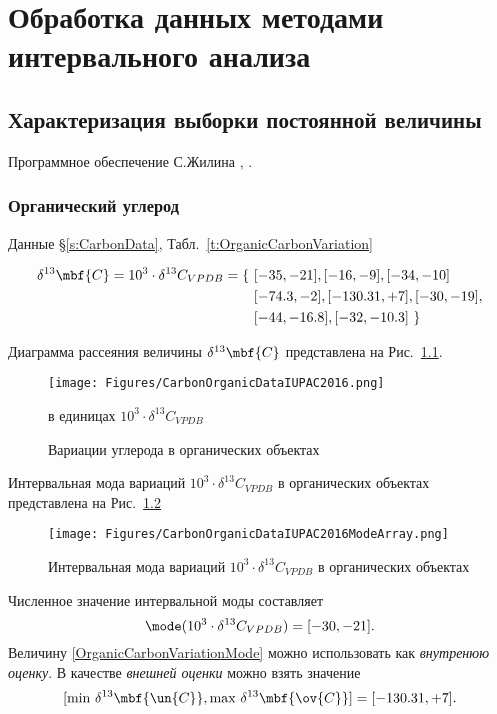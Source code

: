 \documentclass[a5paper,openany]{book}
\begin{document}
\chapter{Обработка данных методами интервального анализа}\label{s:DataAnalysis}

\section{Характеризация выборки постоянной величины}

Программное обеспечение С.Жилина \cite{InteSoft}, \cite{InteKaucherSoft}.

\subsection{Органический углерод}

Данные \S\ref{s:CarbonData}, Табл.~\ref{t:OrganicCarbonVariation}

\begin{align}
\delta ^{13}\mbf{C} =	10^3 \cdot \delta ^{13}C_{VPDB} = \{ \
&	[-35, -21 ], [ -16, -9 ], [ -34, -10 ] \nonumber \\
&	[ -74.3, -2 ], [ -130.31, +7 ], [ -30, -19], \nonumber \\
& 	[ -44, -16.8], [ -32, -10.3] \	\}
\end{align}

Диаграмма рассеяния величины $\delta ^{13}\mbf{C}$ представлена на Рис.~\ref{f:OrganicCarbonVariation}.
\begin{figure}[ht] 
	\centering\small
	\unitlength=1mm
	{\texttt{[image: Figures/CarbonOrganicDataIUPAC2016.png]}} 
	\caption{Вариации углерода в органических объектах} в единицах $10^3 \cdot \delta ^{13}C_{VPDB}$
\label{f:OrganicCarbonVariation}
\end{figure}

Интервальная мода   
вариаций $10^3 \cdot \delta ^{13}C_{VPDB}$ в органических объектах представлена на Рис.~\ref{f:OrganicCarbonVariationMode}
\begin{figure}[ht] 
\begin{center}
	\unitlength=1mm
	{\texttt{[image: Figures/CarbonOrganicDataIUPAC2016ModeArray.png]}} 
	\caption{Интервальная мода 
		вариаций $10^3 \cdot \delta ^{13}C_{VPDB}$ в органических объектах} 
	\label{f:OrganicCarbonVariationMode}
\end{center}	
\end{figure}

Численное значение интервальной моды составляет 
\begin{equation}\label{OrganicCarbonVariationMode}
	\mode ( 10^3 \cdot \delta ^{13}C_{VPDB} ) = [-30, -21].
\end{equation}
Величину \eqref{OrganicCarbonVariationMode} можно использовать как \emph{внутренюю оценку}.
В качестве \emph{внешней оценки} можно взять значение
\begin{equation}\label{OrganicCarbonVariationOut}
[\min \, \delta ^{13}\mbf{\un{C}},  \max \, \delta ^{13}\mbf{\ov{C}}] = [ -130.31, +7 ].
\end{equation}
\end{document}
